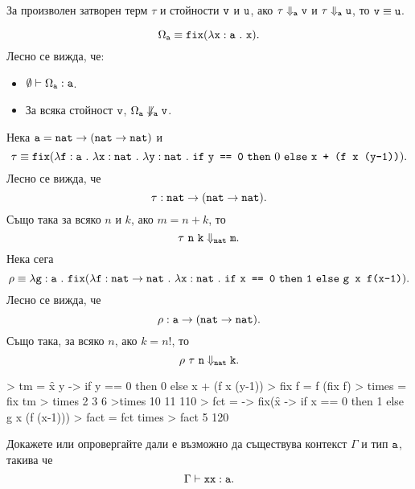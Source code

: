 \begin{lemma}
  За произволен затворен терм $\tau$ и стойности $\texttt{v}$ и $\texttt{u}$,
  ако $\tau \Downarrow_{\texttt{a}} \texttt{v}$ и $\tau \Downarrow_{\texttt{a}} \texttt{u}$, то $\texttt{v} \equiv \texttt{u}$.
\end{lemma}

\begin{example}
  \[\Omega_{\texttt{a}} \equiv \texttt{fix}(\lambda\texttt{x}:\texttt{a}\ .\ {\texttt{x}}).\]
  Лесно се вижда, че:
  \begin{itemize}
  \item
    $\emptyset \vdash \Omega_{\texttt{a}} : \texttt{a}$.
  \item
    За всяка стойност $\texttt{v}$,
    $\Omega_{\texttt{a}} \not\Downarrow_{\texttt{a}} \texttt{v}$.
  \end{itemize}
\end{example}

\begin{example}
  Нека $\texttt{a} = \texttt{nat} \to (\texttt{nat} \to \texttt{nat})$ и 
  \[\tau \equiv \texttt{fix}(\lambda\texttt{f}:\texttt{a}\ .\ {\lambda\texttt{x}:\texttt{nat}\ .\ {\lambda\texttt{y}:\texttt{nat}\ .\ {\texttt{if}\ \texttt{y == 0}\ \texttt{then}\ 0\ \texttt{else}\ \texttt{x + (f x (y-1))}}}}).\]
  Лесно се вижда, че
  \[\tau:\texttt{nat} \to (\texttt{nat} \to \texttt{nat}).\]
  Също така за всяко $n$ и $k$, ако $m = n + k$, то
  \[\tau\ \texttt{n}\ \texttt{k} \Downarrow_{\texttt{nat}} \texttt{m}.\]
  Нека сега
  \[\rho \equiv \lambda\texttt{g}:\texttt{a}\ .\ {\texttt{fix}(\lambda \texttt{f} : \texttt{nat}\to\texttt{nat}\ .\ \lambda\texttt{x}:\texttt{nat}\ .\ {\texttt{if}\ \texttt{x == 0}\ \texttt{then}\ \texttt{1}\ \texttt{else}\ \texttt{g x f(x-1)}}}).\]
  Лесно се вижда, че
  \[ \rho : \texttt{a} \to (\texttt{nat} \to \texttt{nat}).\]
  Също така, за всяко $n$, ако $k = n!$, то
  \[ \rho\ \tau\ \texttt{n} \Downarrow_{\texttt{nat}} \texttt{k}.\]
\end{example}

\begin{haskellcode}
> tm = \f x y -> if y == 0 then 0 else x + (f x (y-1))
> fix f = f (fix f)
> times = fix tm
> times 2 3
6
>times 10 11
110
> fct = \g -> fix(\f x -> if x == 0 then 1 else g x (f (x-1)))
> fact = fct times
> fact 5
120
\end{haskellcode}

\begin{problem}
  Докажете или опровергайте дали е възможно да съществува контекст $\Gamma$ и тип $\texttt{a}$, такива че
  \[\Gamma \vdash \texttt{xx}:\texttt{a}.\]
\end{problem}


